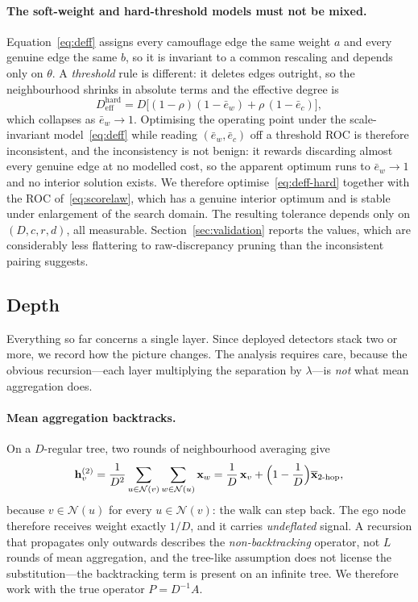 \documentclass[onecolumn,pdflatex,sn-basic,Numbered]{sn-jnl}
\theoremstyle{thmstyleone}
\theoremstyle{thmstylethree}
\begin{document}
\paragraph{The soft-weight and hard-threshold models must not be mixed.}
Equation~\eqref{eq:deff} assigns every camouflage edge the same weight $a$ and every
genuine edge the same $b$, so it is invariant to a common rescaling and depends only
on $\theta$. A \emph{threshold} rule is different: it deletes edges outright, so the
neighbourhood shrinks in absolute terms and the effective degree is
\begin{equation}
    D^{\mathrm{hard}}_{\mathrm{eff}}
    = D\bigl[(1-\rho)(1-\bar e_w) + \rho\,(1-\bar e_c)\bigr] ,
    \label{eq:deff-hard}
\end{equation}
which collapses as $\bar e_w \to 1$. Optimising the operating point under the
scale-invariant model~\eqref{eq:deff} while reading $(\bar e_w, \bar e_c)$ off a
threshold ROC is therefore inconsistent, and the inconsistency is not benign: it
rewards discarding almost every genuine edge at no modelled cost, so the apparent
optimum runs to $\bar e_w \to 1$ and no interior solution exists. We therefore
optimise~\eqref{eq:deff-hard} together with the ROC of~\eqref{eq:scorelaw}, which has
a genuine interior optimum and is stable under enlargement of the search domain.
The resulting tolerance depends only on $(D, c, r, d)$, all measurable.
Section~\ref{sec:validation} reports the values, which are considerably less
flattering to raw-discrepancy pruning than the inconsistent pairing suggests.

\subsection{Depth}
\label{sec:depth}

Everything so far concerns a single layer. Since deployed detectors stack two or
more, we record how the picture changes. The analysis requires care, because the
obvious recursion---each layer multiplying the separation by $\lambda$---is
\emph{not} what mean aggregation does.

\paragraph{Mean aggregation backtracks.}
On a $D$-regular tree, two rounds of neighbourhood averaging give
\begin{equation}
    \mathbf{h}^{(2)}_v
    = \frac{1}{D^2}\sum_{u\in\mathcal{N}(v)}\sum_{w\in\mathcal{N}(u)}\mathbf{x}_w
    = \frac{1}{D}\,\mathbf{x}_v
      + \Bigl(1-\frac{1}{D}\Bigr)\overline{\mathbf{x}}_{2\text{-hop}} ,
    \label{eq:backtrack}
\end{equation}
because $v \in \mathcal{N}(u)$ for every $u \in \mathcal{N}(v)$: the walk can step
back. The ego node therefore receives weight exactly $1/D$, and it carries
\emph{undeflated} signal. A recursion that propagates only outwards describes the
\emph{non-backtracking} operator, not $L$ rounds of mean aggregation, and the
tree-like assumption does not license the substitution---the backtracking term is
present on an infinite tree. We therefore work with the true operator
$P = D^{-1}A$.
\end{document}
